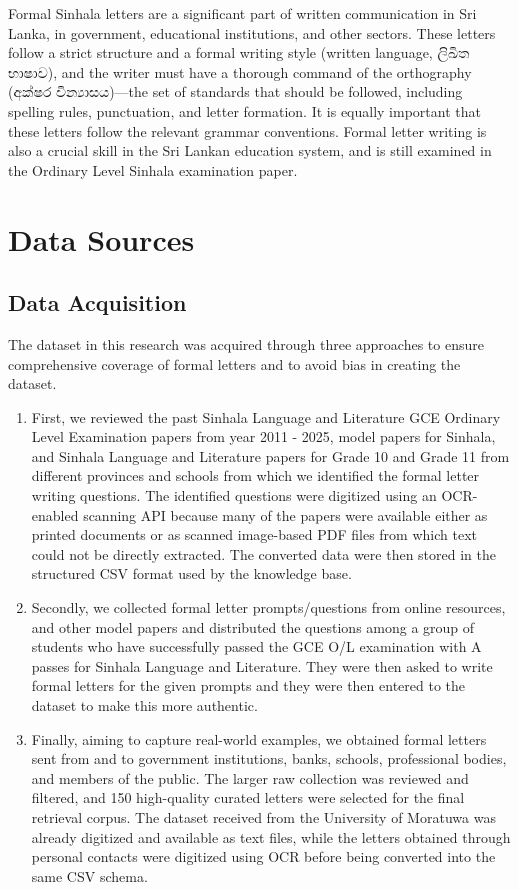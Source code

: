 \documentclass[12pt]{uomthesis}
\begin{document}
Formal Sinhala letters are a significant part of written communication in Sri Lanka, in government, educational institutions, and other sectors. These letters follow a strict structure and a formal writing style (written language, {\sinhalafont ලිඛිත භාෂාව}), and the writer must have a thorough command of the orthography ({\sinhalafont අක්ෂර වින්‍යාසය})—the set of standards that should be followed, including spelling rules, punctuation, and letter formation. It is equally important that these letters follow the relevant grammar conventions. Formal letter writing is also a crucial skill in the Sri Lankan education system, and is still examined in the Ordinary Level Sinhala examination paper.

\section{Data Sources}
\subsection{Data Acquisition}
The dataset in this research was acquired through three approaches to ensure comprehensive coverage of formal letters and to avoid bias in creating the dataset.

\begin{enumerate}
    \item First, we reviewed the past Sinhala Language and Literature GCE Ordinary Level Examination papers from year 2011 - 2025, model papers for Sinhala, and Sinhala Language and Literature papers for Grade 10 and Grade 11 from different provinces and schools from which we identified the formal letter writing questions. The identified questions were digitized using an OCR-enabled scanning API because many of the papers were available either as printed documents or as scanned image-based PDF files from which text could not be directly extracted. The converted data were then stored in the structured CSV format used by the knowledge base.
    \item Secondly, we collected formal letter prompts/questions from online resources, and other model papers and distributed the questions among a group of students who have successfully passed the GCE O/L examination with A passes for Sinhala Language and Literature. They were then asked to write formal letters for the given prompts and they were then entered to the dataset to make this more authentic. 
    \item Finally, aiming to capture real-world examples, we obtained formal letters sent from and to government institutions, banks, schools, professional bodies, and members of the public. The larger raw collection was reviewed and filtered, and 150 high-quality curated letters were selected for the final retrieval corpus. The dataset received from the University of Moratuwa was already digitized and available as text files, while the letters obtained through personal contacts were digitized using OCR before being converted into the same CSV schema.
\end{enumerate}
\end{document}
